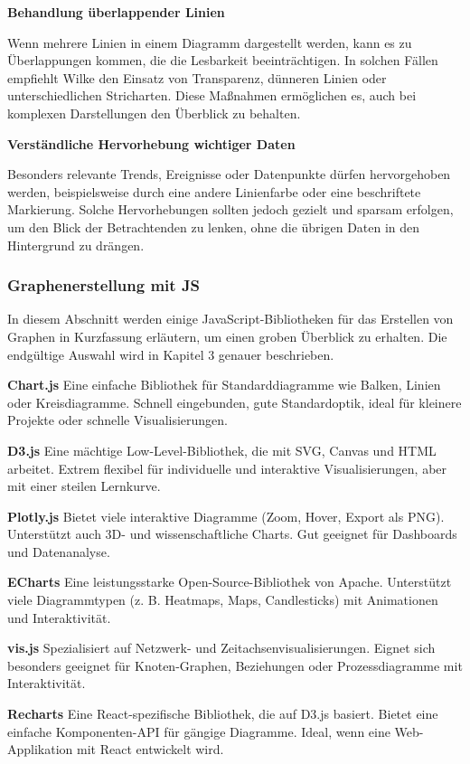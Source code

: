 \item
\textbf{Behandlung überlappender Linien}

Wenn mehrere Linien in einem Diagramm dargestellt werden, kann es zu Überlappungen kommen, die die Lesbarkeit beeinträchtigen.
In solchen Fällen empfiehlt Wilke den Einsatz von Transparenz, dünneren Linien oder unterschiedlichen Stricharten.
Diese Maßnahmen ermöglichen es, auch bei komplexen Darstellungen den Überblick zu behalten.
\item
\textbf{Verständliche Hervorhebung wichtiger Daten}

Besonders relevante Trends, Ereignisse oder Datenpunkte dürfen hervorgehoben werden, beispielsweise durch eine andere Linienfarbe oder eine beschriftete Markierung.
Solche Hervorhebungen sollten jedoch gezielt und sparsam erfolgen, um den Blick der Betrachtenden zu lenken, ohne die übrigen Daten in den Hintergrund zu drängen.

\subsubsection{Graphenerstellung mit JS}

In diesem Abschnitt werden einige JavaScript-Bibliotheken für das Erstellen von Graphen
in Kurzfassung erläutern, um einen groben Überblick zu erhalten.
Die endgültige Auswahl wird in Kapitel 3 genauer beschrieben.

\textbf{Chart.js}
Eine einfache Bibliothek für Standarddiagramme wie Balken, Linien
oder Kreisdiagramme.
Schnell eingebunden, gute Standardoptik, ideal für kleinere Projekte oder schnelle Visualisierungen. \cite{Chartjs2025}

\textbf{D3.js}
Eine mächtige Low-Level-Bibliothek, die mit \ac{SVG}, Canvas und HTML arbeitet.
Extrem flexibel für individuelle und interaktive Visualisierungen, aber mit einer steilen Lernkurve. \cite{D3js2025}

\textbf{Plotly.js}
Bietet viele interaktive Diagramme (Zoom, Hover, Export als PNG). Unterstützt
auch 3D- und wissenschaftliche Charts.
Gut geeignet für Dashboards und Datenanalyse. \cite{Plotlyjs2025}

\textbf{ECharts}
Eine leistungsstarke Open-Source-Bibliothek von Apache. Unterstützt viele
Diagrammtypen (z. B. Heatmaps, Maps, Candlesticks) mit Animationen und Interaktivität. \cite{ECharts2025}

\textbf{vis.js}
Spezialisiert auf Netzwerk- und Zeitachsenvisualisierungen. Eignet sich
besonders geeignet für Knoten-Graphen, Beziehungen oder Prozessdiagramme mit Interaktivität. \cite{Visjs2025}

\textbf{Recharts}
Eine React-spezifische Bibliothek, die auf D3.js basiert.
Bietet eine einfache Komponenten-API für gängige Diagramme.
Ideal, wenn eine Web-Applikation mit React entwickelt wird. \cite{Recharts2025}





